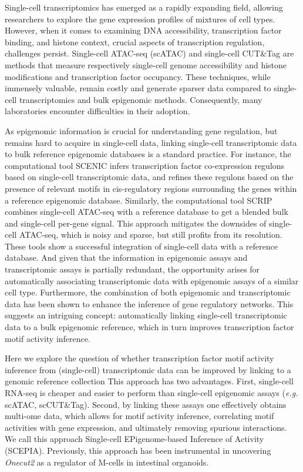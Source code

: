 Single-cell transcriptomics has emerged as a rapidly expanding field, allowing researchers to explore the gene expression profiles of mixtures of cell types. However, when it comes to examining DNA accessibility, transcription factor binding, and histone context, crucial aspects of transcription regulation, challenges persist. Single-cell ATAC-seq (scATAC)\cite{Buenrostro2015_sc} and single-cell CUT\&Tag\cite{Kaya_Okur_2019} are methods that measure respectively single-cell genome accessibility and histone modifications and transcription factor occupancy. These techniques, while immensely valuable, remain costly and generate sparser data compared to single-cell transcriptomics and bulk epigenomic methods\cite{Li2021}. Consequently, many laboratories encounter difficulties in their adoption.

As epigenomic information is crucial for understanding gene regulation, but remains hard to acquire in single-cell data, linking single-cell transcriptomic data to bulk reference epigenomic databases is a standard practice. For instance, the computational tool SCENIC infers transcription factor co-expression regulons based on single-cell transcriptomic data, and refines these regulons based on the presence of relevant motifs in cis-regulatory regions surrounding the genes within a reference epigenomic database\cite{Aibar_2017,VandeSande2020}. Similarly, the computational tool SCRIP combines single-cell ATAC-seq with a reference database to get a blended bulk and single-cell per-gene signal. This approach mitigates the downsides of single-cell ATAC-seq, which is noisy and sparse, but still profits from its resolution\cite{Dong2022}. These tools show a successful integration of single-cell data with a reference database. And given that the information in epigenomic assays and transcriptomic assays is partially redundant\cite{Wang2016,GonzlezRamrez2021}, the opportunity arises for automatically associating transcriptomic data with epigenomic assays of a similar cell type. Furthermore, the combination of both epigenomic and transcriptomic data has been shown to enhance the inference of gene regulatory networks\cite{Xu_2020,Kamal_2021}. This suggests an intriguing concept: automatically linking single-cell transcriptomic data to a bulk epigenomic reference, which in turn improves transcription factor motif activity inference.

Here we explore the question of whether transcription factor motif activity inference from (single-cell) transcriptomic data can be improved by linking to a genomic reference collection This approach has two advantages. First, single-cell RNA-seq is cheaper and easier to perform than single-cell epigenomic assays (\textit{e.g.} scATAC, scCUT\&Tag). Second, by linking these assays one effectively obtains multi-ome data, which allows for motif activity inference, correlating motif activities with gene expression, and ultimately removing spurious interactions. We call this approach Single-cell EPigenome-based Inference of Activity (SCEPIA). Previously, this approach has been instrumental in uncovering \textit{Onecut2} as a regulator of M-cells in intestinal organoids\cite{LunaVelez2023}. 

